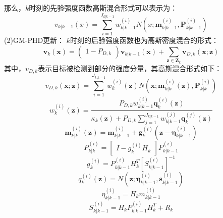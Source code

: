 那么，$k$时刻的先验强度函数高斯混合形式可以表示为：
\begin{equation}
    v_{k|k-1}(x)=\sum_{i=1}^{J_{k|k-1}}w_{k|k-1}^{(i)}N\left(x;\boldsymbol{m}_{k|k-1}^{(i)},\boldsymbol{P}_{k|k-1}^{(i)}\right)
\end{equation}
(2)GM-PHD更新：
$k$时刻的后验强度函数也为高斯密度混合的形式：
\begin{equation}
    \boldsymbol{v}_{k}(\boldsymbol{x})=\begin{pmatrix}1-P_{D,k}\end{pmatrix}\boldsymbol{v}_{k|k-1}(\boldsymbol{x})+\sum_{\mathbf{z}\in\mathbf{Z}_{k}}\boldsymbol{v}_{D,k}(\boldsymbol{x};\boldsymbol{z})
\end{equation}
其中，$v_{D,k}$表示目标被检测到部分的强度分量，其高斯混合形式如下：
\begin{equation}
    v_{D,k}(\boldsymbol{x};\boldsymbol{z})=\sum_{i=1}^{J_{k|k-1}}w_{k}^{(i)}(\boldsymbol{z})N\left(\boldsymbol{x};\boldsymbol{m}_{k|k}^{(i)}(\boldsymbol{z}),\boldsymbol{P}_{k|k}^{(i)}\right)
\end{equation}
\begin{equation}
    w_{k}^{(i)}(\mathbf{z})=\frac{P_{D,k}w_{k|k-1}^{(i)}\boldsymbol{q}_{k}^{(i)}(\mathbf{z})}{\kappa_{k}(\mathbf{z})+P_{D,k}\sum_{j=1}^{J_{k|k-1}}w_{k|k-1}^{(j)}\boldsymbol{q}_{k}^{(j)}(\mathbf{z})}
\end{equation}
\begin{equation}
    \boldsymbol{m}_{k|k}^{(i)}(\mathbf{z})=\boldsymbol{m}_{k|k-1}^{(i)}+\boldsymbol{g}_{k}^{(i)}\left(\mathbf{z}-\boldsymbol{\eta}_{k|k-1}^{(i)}\right)
\end{equation}
\begin{equation}
    P_{k|k}^{(i)}=\begin{bmatrix}I-g_k^{(i)}H_k\end{bmatrix}P_{k|k-1}^{(i)}
\end{equation}
\begin{equation}
    g_{k}^{(i)}=P_{k|k-1}^{(i)}H_{k}^{T}\left[S_{k|k-1}^{(i)}\right]^{-1}
\end{equation}
\begin{equation}
    q_k^{(i)}(\mathbf{z})=N\left(\mathbf{z};\boldsymbol{\eta}_{k|k-1}^{(i)},\boldsymbol{s}_{k|k-1}^{(i)}\right)
\end{equation}
\begin{equation}
    \eta_{k|k-1}^{(i)}=H_km_{k|k-1}^{(i)}
\end{equation}
\begin{equation}
    S_{k|k-1}^{(i)}=H_{k}P_{k|k-1}^{(i)}H_{k}^{T}+R_{k}
\end{equation}


